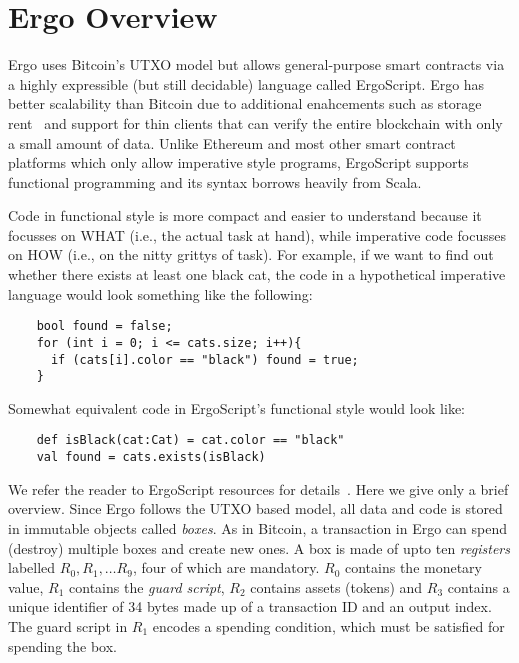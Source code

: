 \documentclass[runningheads]{llncs}
\newcommand{\langname}{ErgoScript\xspace}
\begin{document}

\section{Ergo Overview}
\label{ergo-overview}

Ergo uses Bitcoin's UTXO model but allows general-purpose smart contracts via a highly expressible (but still decidable) language called \langname. Ergo has better scalability than Bitcoin due to additional enahcements such as storage rent~\cite{chepurnoy2018systematic} and support for thin clients that can verify the entire blockchain with only a small amount of data. Unlike Ethereum and most other smart contract platforms which only allow imperative style programs, \langname supports functional programming and its syntax borrows heavily from Scala. 

Code in functional style is more compact and easier to understand because it focusses on WHAT (i.e., the actual task at hand), while imperative code focusses on HOW (i.e., on the nitty grittys of task). For example, if we want to find out whether there exists at least one black cat, the code in a hypothetical imperative language would look something like the following:
\begin{verbatim}
    bool found = false;
    for (int i = 0; i <= cats.size; i++){
      if (cats[i].color == "black") found = true; 
    }
\end{verbatim}

Somewhat equivalent code in \langname's functional style would look like:

\begin{verbatim}
    def isBlack(cat:Cat) = cat.color == "black"
    val found = cats.exists(isBlack)
\end{verbatim}

We refer the reader to \langname resources for details~\cite{langrepo,tutorial,advtutorial}. Here we give only a brief overview.
Since Ergo follows the UTXO based model, all data and code is stored in immutable objects called {\em boxes}. As in Bitcoin, a transaction in Ergo can spend (destroy) multiple boxes and create new ones. 
A box is made of upto ten {\em registers} labelled $R_0, R_1,\ldots R_9$, four of which are mandatory. $R_0$ contains the monetary value, $R_1$ contains the {\em guard script}, $R_2$ contains assets (tokens) and $R_3$ contains a unique identifier of 34 bytes made up of a transaction ID and an output index. The guard script in $R_1$ encodes a spending condition, which must be satisfied for spending the box. 
\end{document}

